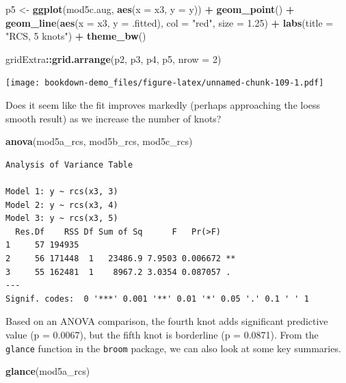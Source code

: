 \documentclass[]{book}
\newenvironment{Shaded}{\begin{snugshade}}{\end{snugshade}}
\newcommand{\KeywordTok}[1]{\textcolor[rgb]{0.13,0.29,0.53}{\textbf{#1}}}
\newcommand{\DataTypeTok}[1]{\textcolor[rgb]{0.13,0.29,0.53}{#1}}
\newcommand{\DecValTok}[1]{\textcolor[rgb]{0.00,0.00,0.81}{#1}}
\newcommand{\FloatTok}[1]{\textcolor[rgb]{0.00,0.00,0.81}{#1}}
\newcommand{\StringTok}[1]{\textcolor[rgb]{0.31,0.60,0.02}{#1}}
\newcommand{\OperatorTok}[1]{\textcolor[rgb]{0.81,0.36,0.00}{\textbf{#1}}}
\newcommand{\NormalTok}[1]{#1}
\theoremstyle{definition}
\theoremstyle{definition}
\theoremstyle{definition}
\theoremstyle{remark}
\begin{document}
\begin{Shaded}
\begin{Highlighting}[]
\NormalTok{p5 <-}\StringTok{ }\KeywordTok{ggplot}\NormalTok{(mod5c.aug, }\KeywordTok{aes}\NormalTok{(}\DataTypeTok{x =}\NormalTok{ x3, }\DataTypeTok{y =}\NormalTok{ y)) }\OperatorTok{+}
\StringTok{    }\KeywordTok{geom_point}\NormalTok{() }\OperatorTok{+}
\StringTok{    }\KeywordTok{geom_line}\NormalTok{(}\KeywordTok{aes}\NormalTok{(}\DataTypeTok{x =}\NormalTok{ x3, }\DataTypeTok{y =}\NormalTok{ .fitted), }
              \DataTypeTok{col =} \StringTok{"red"}\NormalTok{, }\DataTypeTok{size =} \FloatTok{1.25}\NormalTok{) }\OperatorTok{+}
\StringTok{    }\KeywordTok{labs}\NormalTok{(}\DataTypeTok{title =} \StringTok{"RCS, 5 knots"}\NormalTok{) }\OperatorTok{+}
\StringTok{    }\KeywordTok{theme_bw}\NormalTok{()}

\NormalTok{gridExtra}\OperatorTok{::}\KeywordTok{grid.arrange}\NormalTok{(p2, p3, p4, p5, }\DataTypeTok{nrow =} \DecValTok{2}\NormalTok{)}
\end{Highlighting}
\end{Shaded}

\texttt{[image: bookdown-demo\_files/figure-latex/unnamed-chunk-109-1.pdf]}

Does it seem like the fit improves markedly (perhaps approaching the
loess smooth result) as we increase the number of knots?

\begin{Shaded}
\begin{Highlighting}[]
\KeywordTok{anova}\NormalTok{(mod5a_rcs, mod5b_rcs, mod5c_rcs)}
\end{Highlighting}
\end{Shaded}

\begin{verbatim}
Analysis of Variance Table

Model 1: y ~ rcs(x3, 3)
Model 2: y ~ rcs(x3, 4)
Model 3: y ~ rcs(x3, 5)
  Res.Df    RSS Df Sum of Sq      F   Pr(>F)   
1     57 194935                                
2     56 171448  1   23486.9 7.9503 0.006672 **
3     55 162481  1    8967.2 3.0354 0.087057 . 
---
Signif. codes:  0 '***' 0.001 '**' 0.01 '*' 0.05 '.' 0.1 ' ' 1
\end{verbatim}

Based on an ANOVA comparison, the fourth knot adds significant
predictive value (p = 0.0067), but the fifth knot is borderline (p =
0.0871). From the \texttt{glance} function in the \texttt{broom}
package, we can also look at some key summaries.

\begin{Shaded}
\begin{Highlighting}[]
\KeywordTok{glance}\NormalTok{(mod5a_rcs)}
\end{Highlighting}
\end{Shaded}
\end{document}
